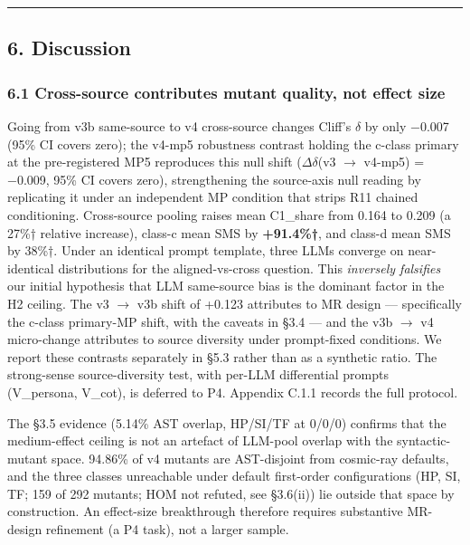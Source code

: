 \documentclass[review,12pt,authoryear]{elsarticle}
\begin{document}
\begin{center}\rule{0.5\linewidth}{0.5pt}\end{center}

\subsection{6. Discussion}\label{discussion}

\subsubsection{6.1 Cross-source contributes mutant quality, not effect
size}\label{cross-source-contributes-mutant-quality-not-effect-size}

Going from v3b same-source to v4 cross-source changes Cliff's $\delta$ by only
−0.007 (95\% CI covers zero); the v4-mp5 robustness contrast holding the
c-class primary at the pre-registered MP5 reproduces this null shift
($\Delta$$\delta$(v3 $\to$ v4-mp5) = −0.009, 95\% CI covers zero), strengthening the
source-axis null reading by replicating it under an independent MP
condition that strips R11 chained conditioning. Cross-source pooling
raises mean C1\_share from 0.164 to 0.209 (a 27\%† relative increase),
class-c mean SMS by \textbf{+91.4\%†}, and class-d mean SMS by 38\%†.
Under an identical prompt template, three LLMs converge on
near-identical distributions for the aligned-vs-cross question. This
\emph{inversely falsifies} our initial hypothesis that LLM same-source
bias is the dominant factor in the H2 ceiling. The v3 $\to$ v3b shift of
+0.123 attributes to MR design --- specifically the c-class primary-MP
shift, with the caveats in §3.4 --- and the v3b $\to$ v4 micro-change
attributes to source diversity under prompt-fixed conditions. We report
these contrasts separately in §5.3 rather than as a synthetic ratio. The
strong-sense source-diversity test, with per-LLM differential prompts
(V\_persona, V\_cot), is deferred to P4. Appendix C.1.1 records the full
protocol.

The §3.5 evidence (5.14\% AST overlap, HP/SI/TF at 0/0/0) confirms that
the medium-effect ceiling is not an artefact of LLM-pool overlap with
the syntactic-mutant space. 94.86\% of v4 mutants are AST-disjoint from
cosmic-ray defaults, and the three classes unreachable under default
first-order configurations (HP, SI, TF; 159 of 292 mutants; HOM not
refuted, see §3.6(ii)) lie outside that space by construction. An
effect-size breakthrough therefore requires substantive MR-design
refinement (a P4 task), not a larger sample.
\end{document}

